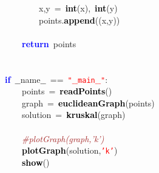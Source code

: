 \mbox{}\ \ \ \ \ \ \ \ x\textcolor{BrickRed}{,}y\ \textcolor{BrickRed}{=}\ \textbf{\textcolor{Black}{int}}\textcolor{BrickRed}{(}x\textcolor{BrickRed}{),}\ \textbf{\textcolor{Black}{int}}\textcolor{BrickRed}{(}y\textcolor{BrickRed}{)} \\
\mbox{}\ \ \ \ \ \ \ \ points\textcolor{BrickRed}{.}\textbf{\textcolor{Black}{append}}\textcolor{BrickRed}{((}x\textcolor{BrickRed}{,}y\textcolor{BrickRed}{))} \\
\mbox{} \\
\mbox{}\ \ \ \ \textbf{\textcolor{Blue}{return}}\ points \\
\mbox{} \\
\mbox{} \\
\mbox{}\textbf{\textcolor{Blue}{if}}\ $\_$$\_$name$\_$$\_$\ \textcolor{BrickRed}{==}\ \texttt{\textcolor{Red}{"{}$\_$$\_$main$\_$$\_$"{}}}\textcolor{BrickRed}{:} \\
\mbox{}\ \ \ \ points\ \textcolor{BrickRed}{=}\ \textbf{\textcolor{Black}{readPoints}}\textcolor{BrickRed}{()} \\
\mbox{}\ \ \ \ graph\ \textcolor{BrickRed}{=}\ \textbf{\textcolor{Black}{euclideanGraph}}\textcolor{BrickRed}{(}points\textcolor{BrickRed}{)} \\
\mbox{}\ \ \ \ solution\ \textcolor{BrickRed}{=}\ \textbf{\textcolor{Black}{kruskal}}\textcolor{BrickRed}{(}graph\textcolor{BrickRed}{)} \\
\mbox{}\ \ \ \  \\
\mbox{}\ \ \ \ \textit{\textcolor{Brown}{\#plotGraph(graph,'k')}} \\
\mbox{}\ \ \ \ \textbf{\textcolor{Black}{plotGraph}}\textcolor{BrickRed}{(}solution\textcolor{BrickRed}{,}\texttt{\textcolor{Red}{'k'}}\textcolor{BrickRed}{)} \\
\mbox{}\ \ \ \ \textbf{\textcolor{Black}{show}}\textcolor{BrickRed}{()} \\
\mbox{}

